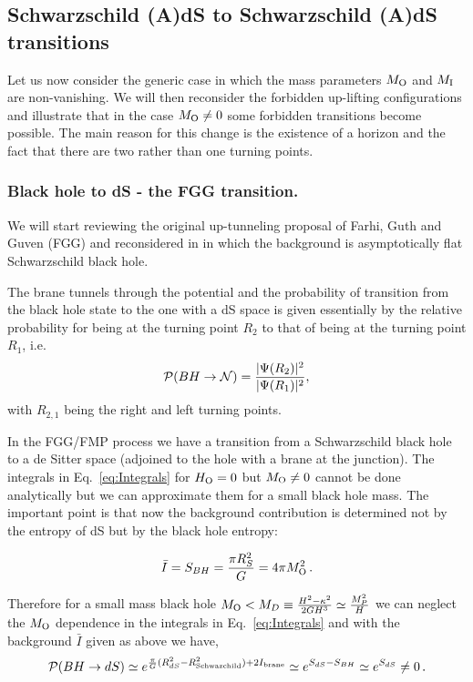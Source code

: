 \documentclass[a4paper,11pt]{article}
\numberwithin{equation}{section}
\newcommand{\be}{\begin{equation}}
\newcommand{\ee}{\end{equation}}
\numberwithin{equation}{section}
\begin{document}
\subsection{Schwarzschild (A)dS to Schwarzschild (A)dS transitions}

Let us now consider the generic case in which the mass parameters $M_{\rm O}$ and $M_{\rm I}$ are non-vanishing. We will then reconsider the forbidden up-lifting configurations and illustrate that in the case $M_{\rm O}\neq 0$ some forbidden transitions become possible. The main reason for this change is the existence of a horizon and the fact that there are two rather than one turning points.

\subsubsection{Black hole to dS - the FGG transition.}

We will start reviewing the original up-tunneling proposal of Farhi, Guth and Guven (FGG) \cite{Farhi:1989yr} and reconsidered in \cite{Fischler:1990pk} in which the background is asymptotically flat Schwarzschild black hole.

The brane tunnels through the
potential and the probability of transition
from the black hole state to the one with a dS space 
is given essentially by the relative probability for being at the
turning point $R_2$ to that of being at the turning point $R_{1}$,
i.e.
\begin{equation}
{\mathcal P}(BH\rightarrow{\cal N)}=\frac{|\Psi(R_2)|^{2}}{|\Psi(R_{1})|^{2}},\label{eq:Pio}
\end{equation}
with $R_{2,1}$ being the right and left turning points.


In the FGG/FMP process we have a transition from a Schwarzschild
black hole to a de Sitter space (adjoined to the hole with a brane
at the junction). The integrals in Eq.~\eqref{eq:Integrals} for $H_{\rm O} = 0$ but $M_{\rm O}\neq 0$ cannot be done analytically but we can approximate them for a small black hole mass. The important point is that  now the background contribution is determined not by the entropy of dS but by the black hole entropy:

\be
\bar I=S_{BH}=\frac{\pi R_S^2}{G}=4\pi M_{\rm O}^2 \,.
\ee

Therefore for a small mass black hole $M_{\rm O}<M_{D}\equiv\frac{H^{2}-\kappa^{2}}{2GH^{3}}\simeq\frac{M_{P}^{2}}{H}$
we can neglect the $M_{\rm O}$ dependence in the integrals in Eq.~\eqref{eq:Integrals} and with the background $\bar I$ given as above we have,
\be
{\mathcal P}(BH\rightarrow dS)\simeq e^{\frac{\pi}{G}(R_{dS}^{2}-R_{{\rm Schwazchild}}^{2})+2I_{{\rm brane}}}\simeq e^{S_{dS}-S_{BH}} \simeq e^{S_{dS}}\neq 0 \,.\label{eq:bhds}
\ee
\end{document}
